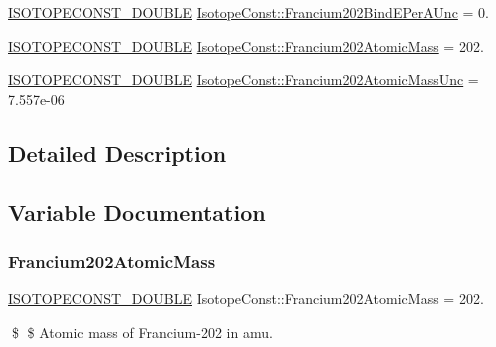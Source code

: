 \begin{DoxyCompactItemize}
\mbox{\hyperlink{group___isotope_const-_macros_ga8f45a7272ce02c0b4c65c44636ed719a}{I\+S\+O\+T\+O\+P\+E\+C\+O\+N\+S\+T\+\_\+\+D\+O\+U\+B\+LE}} \mbox{\hyperlink{group___isotope_const-_francium-_fr202_gaa8944bc0774dc5e32f6001be5b183e11}{Isotope\+Const\+::\+Francium202\+Bind\+E\+Per\+A\+Unc}} = 0.
\item 
\mbox{\hyperlink{group___isotope_const-_macros_ga8f45a7272ce02c0b4c65c44636ed719a}{I\+S\+O\+T\+O\+P\+E\+C\+O\+N\+S\+T\+\_\+\+D\+O\+U\+B\+LE}} \mbox{\hyperlink{group___isotope_const-_francium-_fr202_gaf284811b894cdb38e875ea6149f0ae2b}{Isotope\+Const\+::\+Francium202\+Atomic\+Mass}} = 202.
\item 
\mbox{\hyperlink{group___isotope_const-_macros_ga8f45a7272ce02c0b4c65c44636ed719a}{I\+S\+O\+T\+O\+P\+E\+C\+O\+N\+S\+T\+\_\+\+D\+O\+U\+B\+LE}} \mbox{\hyperlink{group___isotope_const-_francium-_fr202_ga3137d78b3b69d7b43bfae783565e9384}{Isotope\+Const\+::\+Francium202\+Atomic\+Mass\+Unc}} = 7.\+557e-\/06
\end{DoxyCompactItemize}


\subsection{Detailed Description}


\subsection{Variable Documentation}
\mbox{\label{group___isotope_const-_francium-_fr202_gaf284811b894cdb38e875ea6149f0ae2b}} 
\subsubsection{\texorpdfstring{Francium202\+Atomic\+Mass}{Francium202AtomicMass}}
{\footnotesize\ttfamily \mbox{\hyperlink{group___isotope_const-_macros_ga8f45a7272ce02c0b4c65c44636ed719a}{I\+S\+O\+T\+O\+P\+E\+C\+O\+N\+S\+T\+\_\+\+D\+O\+U\+B\+LE}} Isotope\+Const\+::\+Francium202\+Atomic\+Mass = 202.}

\$ \$ Atomic mass of Francium-\/202 in amu. \mbox{\label{group___isotope_const-_francium-_fr202_ga3137d78b3b69d7b43bfae783565e9384}} 
